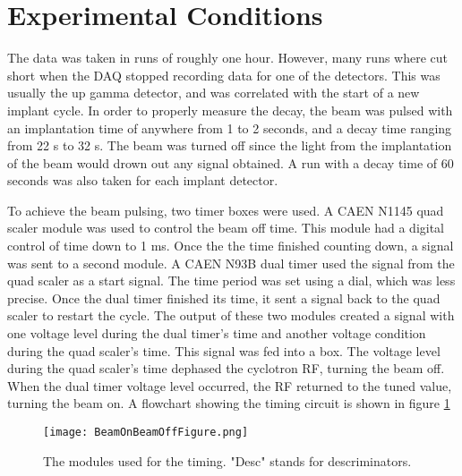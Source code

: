 \documentclass[../MaxHughesThesis.tex]{subfiles}
\begin{document}
\section{Experimental Conditions}
The data was taken in runs of roughly one hour. 
However, many runs where cut short when the DAQ stopped recording data for one of the detectors.
This was usually the up gamma detector, and was correlated with the start of a new implant cycle.
In order to properly measure the decay, the beam was pulsed with an implantation time of anywhere from 1 to 2 seconds, and a decay time ranging from 22 s to 32 s. 
The beam was turned off since the light from the implantation of the beam would drown out any signal obtained. 
A run with a decay time of 60 seconds was also taken for each implant detector. 

To achieve the beam pulsing, two timer boxes were used.
A CAEN N1145 quad scaler module was used to control the beam off time.
This module had a digital control of time down to 1 ms.
Once the the time finished counting down, a signal was sent to a second module. 
A CAEN N93B dual timer used the signal from the quad scaler as a start signal.
The time period was set using a dial, which was less precise. 
Once the dual timer finished its time, it sent a signal back to the quad scaler to restart the cycle.
The output of these two modules created a signal with one voltage level during the dual timer's time and another voltage condition during the quad scaler's time.
This signal was fed into a box.
The voltage level during the quad scaler's time dephased the cyclotron RF, turning the beam off.
When the dual timer voltage level occurred, the RF returned to the tuned value, turning the beam on.  
A flowchart showing the timing circuit is shown in figure \ref{fig:TimingFig} 
\begin{figure}
	\centerline{\texttt{[image: BeamOnBeamOffFigure.png]}}
	\caption{The modules used for the timing.
		 "Desc" stands for descriminators.
		 }
	\label{fig:TimingFig}
\end{figure}
\end{document}
